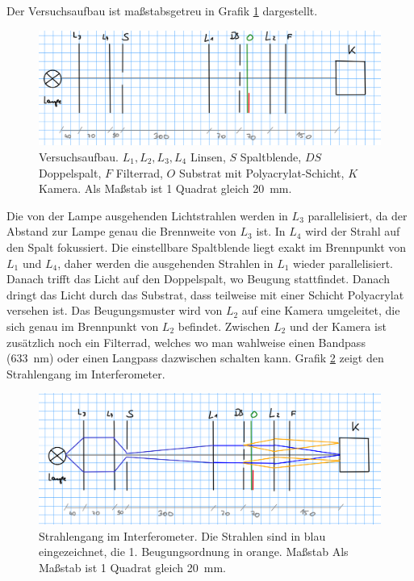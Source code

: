 \documentclass{article}
\begin{document}
Der Versuchsaufbau ist maßstabsgetreu in Grafik \ref{fig:aufbau} dargestellt.
\begin{figure}[H]
\caption{Versuchsaufbau. $L_1,L_2,L_3,L_4$ Linsen, $S$ Spaltblende, $DS$ Doppelspalt, $F$ Filterrad, $O$ Substrat mit Polyacrylat-Schicht, $K$ Kamera. Als Maßstab ist 1 Quadrat gleich 20~mm.}
\label{fig:aufbau}
\includegraphics[scale=1]{aufbau.png}
\end{figure}


Die von der Lampe ausgehenden Lichtstrahlen werden in $L_3$ parallelisiert, da der Abstand zur Lampe genau die Brennweite von $L_3$ ist. In $L_4$ wird der Strahl auf den Spalt fokussiert. Die einstellbare Spaltblende liegt exakt im Brennpunkt von $L_1$ und $L_4$, daher werden die ausgehenden Strahlen in $L_1$ wieder parallelisiert. Danach trifft das Licht auf den Doppelspalt, wo Beugung stattfindet. Danach dringt das Licht durch das Substrat, dass teilweise mit einer Schicht Polyacrylat versehen ist. Das Beugungsmuster wird von $L_2$ auf eine Kamera umgeleitet, die sich genau im Brennpunkt von $L_2$ befindet. Zwischen $L_2$ und der Kamera ist zusätzlich noch ein Filterrad, welches wo man wahlweise einen Bandpass (633~nm) oder einen Langpass dazwischen schalten kann. Grafik \ref{fig:strahlen} zeigt den Strahlengang im Interferometer. 

\begin{figure}[H]
\caption{Strahlengang im Interferometer. Die Strahlen sind in blau eingezeichnet, die 1. Beugungsordnung in orange. Maßstab Als Maßstab ist 1 Quadrat gleich 20~mm.}
\label{fig:strahlen}
\includegraphics[scale=1]{strahlen.png}
\end{figure}
\end{document}
